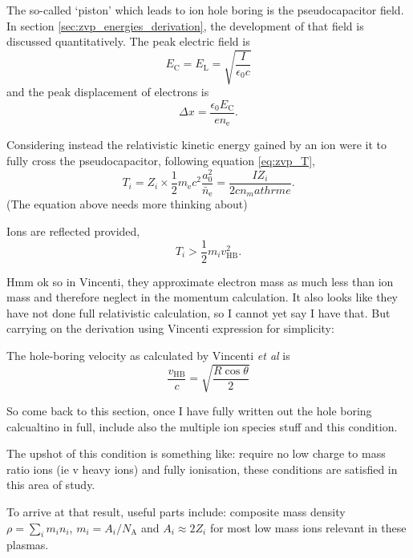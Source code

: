 The so-called `piston' which leads to ion hole boring is the pseudocapacitor field. In section \ref{sec:zvp_energies_derivation}, the development of that field is discussed quantitatively. The peak electric field is
\begin{equation}
	E_\mathrm{C} = E_\mathrm{L} = \sqrt{\frac{I}{\epsilon_0 c}}
\end{equation}
and the peak displacement of electrons is 
\begin{equation}
	\Delta x = \frac{\epsilon_0 E_\mathrm{C}}{en_\mathrm{e}}.
\end{equation}

Considering instead the relativistic kinetic energy gained by an ion were it to fully cross the pseudocapacitor, following equation \ref{eq:zvp_T},
\begin{equation}
	T_i = Z_i \times \frac{1}{2}m_\mathrm{e}c^2 \frac{a^2_0}{\bar{n}_\mathrm{e}} = \frac{IZ_i}{2cn_mathrm{e}}.
\end{equation}
(The equation above needs more thinking about)

Ions are reflected provided,
\begin{equation}
	T_i > \frac{1}{2}m_iv^2_\mathrm{HB}.
\end{equation}

Hmm ok so in Vincenti, they approximate electron mass as much less than ion mass and therefore neglect in the momentum calculation. It also looks like they have not done full relativistic calculation, so I cannot yet say I have that. But carrying on the derivation using Vincenti expression for simplicity:

The hole-boring velocity as calculated by Vincenti \textit{et al} \cite{vincentiOpticalPropertiesRelativistic2014} is
\begin{equation}
	\frac{v_\mathrm{HB} }{c}= \sqrt{\frac{R\cos\theta}{2}}
\end{equation}

So come back to this section, once I have fully written out the hole boring calcualtino in full, include also the multiple ion species stuff and this condition.

The upshot of this condition is something like: require no low charge to mass ratio ions (ie v heavy ions) and fully ionisation, these conditions are satisfied in this area of study.

To arrive at that result, useful parts include:
composite mass density $\rho = \sum_i m_i n_i$, $m_i = A_i/N_\mathrm{A}$ and $A_i \approx 2Z_i$ for most low mass ions relevant in these plasmas.





